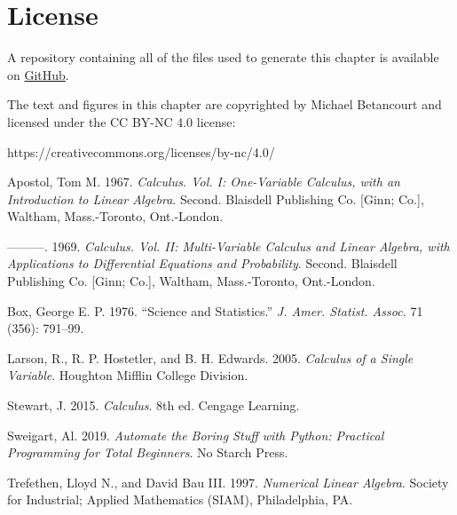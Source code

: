 \documentclass[
  letterpaper,
  DIV=11,
  numbers=noendperiod]{scrartcl}
\newlength{\cslhangindent}
\newlength{\cslentryspacingunit} %
\newenvironment{CSLReferences}[2] %
 {%
  \setlength{\parindent}{0pt}
  \ifodd #1
  \let\oldpar\par
  \def\par{\hangindent=\cslhangindent\oldpar}
  \fi
  \setlength{\parskip}{#2\cslentryspacingunit}
 }%
 {}
\begin{document}
\hypertarget{license}{%
\section*{License}\label{license}}

A repository containing all of the files used to generate this chapter
is available on
\href{https://github.com/betanalpha/quarto_chapters/tree/main/preface}{GitHub}.

The text and figures in this chapter are copyrighted by Michael
Betancourt and licensed under the CC BY-NC 4.0 license:

https://creativecommons.org/licenses/by-nc/4.0/

\hypertarget{refs}{}
\begin{CSLReferences}{1}{0}
\leavevmode{}%
Apostol, Tom M. 1967. \emph{Calculus. {V}ol. {I}: {O}ne-Variable
Calculus, with an Introduction to Linear Algebra}. Second. Blaisdell
Publishing Co. {[}Ginn; Co.{]}, Waltham, Mass.-Toronto, Ont.-London.

\leavevmode{}%
---------. 1969. \emph{Calculus. {V}ol. {II}: {M}ulti-Variable Calculus
and Linear Algebra, with Applications to Differential Equations and
Probability}. Second. Blaisdell Publishing Co. {[}Ginn; Co.{]}, Waltham,
Mass.-Toronto, Ont.-London.

\leavevmode{}%
Box, George E. P. 1976. {``Science and Statistics.''} \emph{J. Amer.
Statist. Assoc.} 71 (356): 791--99.

\leavevmode{}%
Larson, R., R. P. Hostetler, and B. H. Edwards. 2005. \emph{Calculus of
a Single Variable}. Houghton Mifflin College Division.

\leavevmode{}%
Stewart, J. 2015. \emph{Calculus}. 8th ed. Cengage Learning.

\leavevmode{}%
Sweigart, Al. 2019. \emph{Automate the Boring Stuff with Python:
Practical Programming for Total Beginners}. No Starch Press.

\leavevmode{}%
Trefethen, Lloyd N., and David Bau III. 1997. \emph{Numerical Linear
Algebra}. Society for Industrial; Applied Mathematics (SIAM),
Philadelphia, PA.

\end{CSLReferences}
\end{document}
